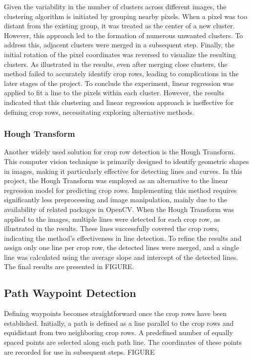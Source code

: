 \documentclass[conference]{IEEEtran}
\begin{document}
Given the variability in the number of clusters across different images, the clustering algorithm is initiated by grouping nearby pixels. When a pixel was too distant from the existing group, it was treated as the center of a new cluster. However, this approach led to the formation of numerous unwanted clusters. To address this, adjacent clusters were merged in a subsequent step. Finally, the initial rotation of the pixel coordinates was reversed to visualize the resulting clusters. As illustrated in the results, even after merging close clusters, the method failed to accurately identify crop rows, leading to complications in the later stages of the project. To conclude the experiment, linear regression was applied to fit a line to the pixels within each cluster. However, the results indicated that this clustering and linear regression approach is ineffective for defining crop rows, necessitating exploring alternative methods.

\subsubsection{Hough Transform}
Another widely used solution for crop row detection is the Hough Transform. This computer vision technique is primarily designed to identify geometric shapes in images, making it particularly effective for detecting lines and curves. In this project, the Hough Transform was employed as an alternative to the linear regression model for predicting crop rows. Implementing this method requires significantly less preprocessing and image manipulation, mainly due to the availability of related packages in OpenCV. When the Hough Transform was applied to the images, multiple lines were detected for each crop row, as illustrated in the results. These lines successfully covered the crop rows, indicating the method's effectiveness in line detection. To refine the results and assign only one line per crop row, the detected lines were merged, and a single line was calculated using the average slope and intercept of the detected lines. The final results are presented in FIGURE.

\subsection{Path Waypoint Detection}
Defining waypoints becomes straightforward once the crop rows have been established. Initially, a path is defined as a line parallel to the crop rows and equidistant from two neighboring crop rows. A predefined number of equally spaced points are selected along each path line. The coordinates of these points are recorded for use in subsequent steps. FIGURE
\end{document}
